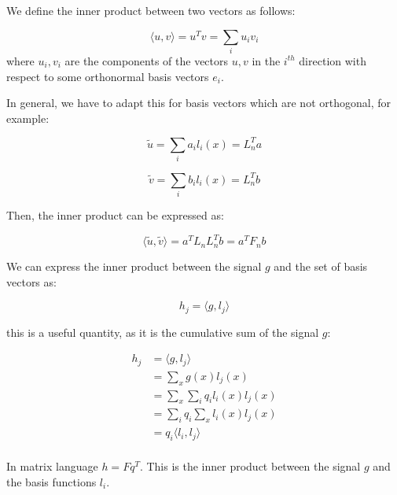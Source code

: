 \begin{definition}
We define the inner product between two vectors as follows:

\begin{equation}
\langle u, v \rangle = u^T v = \sum_i u_i v_i
\end{equation}	
where \(u_i, v_i\) are the components of the vectors \(u,v\) in the \(i^{th}\) direction with respect to some orthonormal basis vectors \(e_i\).

In general, we have to adapt this for basis vectors which are not orthogonal, for example:

\begin{equation}
\tilde{u} = \sum_i a_i l_i\left(x\right) = L_n^T a
\end{equation}

\begin{equation}
\tilde{v} = \sum_i b_i l_i\left(x\right) = L_n^T b
\end{equation}

Then, the inner product can be expressed as:

\begin{equation}
\langle \tilde{u}, \tilde{v} \rangle = a^T L_n L_n^T b = a^T F_n b
\end{equation}	

\end{definition}

\begin{definition}
We can express the inner product between the signal \(g\) and the set of basis vectors as:

\begin{equation}
h_j = \langle g, l_j \rangle
\label{eq:h-est}
\end{equation}

this is a useful quantity, as it is the cumulative sum of the signal \(g\):

\begin{align}
h_j &= \langle g, l_j \rangle \\
&= \sum_x g\left(x\right) l_j\left(x\right) \\
&= \sum_x \sum_i q_i l_i\left(x\right) l_j\left(x\right) \\
&= \sum_i q_i \sum_x l_i\left(x\right) l_j\left(x\right) \\
&= q_i \langle l_i, l_j\rangle \\
\end{align}

In matrix language \(h = F q^T\). This is the inner product between the signal \(g\) and the basis functions \(l_i\).
\end{definition}

